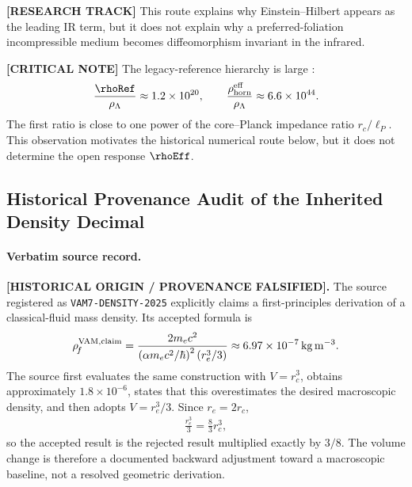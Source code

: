 \textbf{[RESEARCH TRACK]} This route explains why Einstein--Hilbert appears as
the leading IR term, but it does not explain why a preferred-foliation
incompressible medium becomes diffeomorphism invariant in the infrared.

\textbf{[CRITICAL NOTE]} The legacy-reference hierarchy is large
\cite{Planck2018Cosmology}:
\begin{align}
    \frac{\rhoRef}{\rho_\Lambda}
    \approx
    1.2\times10^{20},
    \qquad
    \frac{\rho_{\mathrm{horn}}^{\mathrm{eff}}}{\rho_\Lambda}
    \approx
    6.6\times10^{44}.
\end{align}
The first ratio is close to one power of the core--Planck impedance ratio
\(r_c/\ell_P\).  This observation motivates the historical numerical route
below, but it does not determine the open response \(\rhoEff\).



\subsection{Historical Provenance Audit of the Inherited Density Decimal}
\label{subsec:rt_historical_rhof_provenance_audit}

\paragraph{Verbatim source record.}
\textbf{[HISTORICAL ORIGIN / PROVENANCE FALSIFIED].}
The source registered as \texttt{VAM7-DENSITY-2025} explicitly claims a
first-principles derivation of a classical-fluid mass density.  Its accepted
formula is
\begin{align}
    \rho_{\!f}^{\rm VAM,claim}
    =
    \frac{2m_ec^2}{
        \left(\alpha m_ec^2/\hbar\right)^2
        \left(r_e^3/3\right)}
    \approx
    6.97\times10^{-7}\,\mathrm{kg\,m^{-3}}.
    \label{eq:rt_vam7_verbatim_density_claim}
\end{align}
The source first evaluates the same construction with \(V=r_c^3\), obtains
approximately \(1.8\times10^{-6}\), states that this overestimates the desired
macroscopic density, and then adopts \(V=r_e^3/3\).  Since \(r_e=2r_c\),
\begin{align}
    \frac{r_e^3}{3}
    =
    \frac{8}{3}r_c^3,
\end{align}
so the accepted result is the rejected result multiplied exactly by \(3/8\).
The volume change is therefore a documented backward adjustment toward a
macroscopic baseline, not a resolved geometric derivation.

